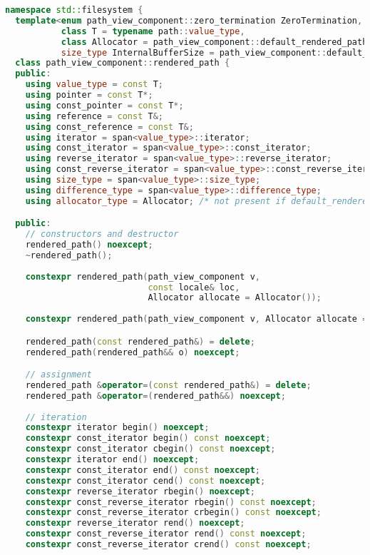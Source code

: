 \documentclass[11pt]{article}
\begin{document}
\begin{lstlisting}[language=cpp]
namespace std::filesystem {
  template<enum path_view_component::zero_termination ZeroTermination,
           class T = typename path::value_type,
           class Allocator = path_view_component::default_rendered_path_allocator<T>,
           size_type InternalBufferSize = path_view_component::default_internal_buffer_size>
  class path_view_component::rendered_path {
  public:
    using value_type = const T;
    using pointer = const T*;
    using const_pointer = const T*;
    using reference = const T&;
    using const_reference = const T&;
    using iterator = span<value_type>::iterator;
    using const_iterator = span<value_type>::const_iterator;
    using reverse_iterator = span<value_type>::reverse_iterator;
    using const_reverse_iterator = span<value_type>::const_reverse_iterator;
    using size_type = span<value_type>::size_type;
    using difference_type = span<value_type>::difference_type;
    using allocator_type = Allocator; /* not present if default_rendered_path_allocator tag type was used */

  public:
    // constructors and destructor
    rendered_path() noexcept;
    ~rendered_path();
    
    constexpr rendered_path(path_view_component v,
                            const locale& loc,
                            Allocator allocate = Allocator());
    
    constexpr rendered_path(path_view_component v, Allocator allocate = Allocator());

    rendered_path(const rendered_path&) = delete;
    rendered_path(rendered_path&& o) noexcept;

    // assignment
    rendered_path &operator=(const rendered_path&) = delete;
    rendered_path &operator=(rendered_path&&) noexcept;
    
    // iteration
    constexpr iterator begin() noexcept;
    constexpr const_iterator begin() const noexcept;
    constexpr const_iterator cbegin() const noexcept;
    constexpr iterator end() noexcept;
    constexpr const_iterator end() const noexcept;
    constexpr const_iterator cend() const noexcept;
    constexpr reverse_iterator rbegin() noexcept;
    constexpr const_reverse_iterator rbegin() const noexcept;
    constexpr const_reverse_iterator crbegin() const noexcept;
    constexpr reverse_iterator rend() noexcept;
    constexpr const_reverse_iterator rend() const noexcept;
    constexpr const_reverse_iterator crend() const noexcept;


\end{lstlisting}
\end{document}
